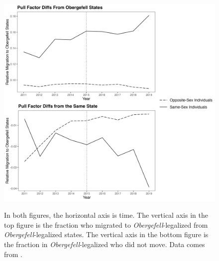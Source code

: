 \documentclass[12pt,letterpaper]{article}
\begin{document}
\begin{figure}[htbp]
    \centering
    \caption{}
    \label{fig: flows_post_diffs_app}
    \includegraphics[width=.75\linewidth]{outputs/summary_stats/flows_post_diffs_app.png}

    \vspace{0.5em}
    \begin{minipage}{0.75\linewidth}
        \footnotesize In both figures, the horizontal axis is time. The vertical axis in the top figure is the fraction who migrated to \textit{Obergefell}-legalized from \textit{Obergefell}-legalized states. The vertical axis in the bottom figure is the fraction in \textit{Obergefell}-legalized who did not move. Data comes from \citet{28}.
    \end{minipage}
\end{figure}
\end{document}
